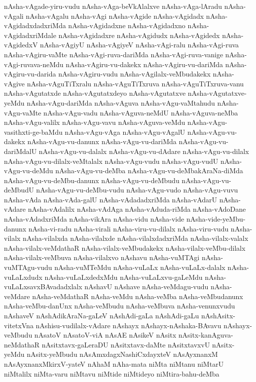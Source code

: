 {nAsha-vAgade-yiru-vudu
nAsha-vAga-beVkAlalxve
nAsha-vAga-lAradu
nAsha-vAgali
nAsha-vAgalu
nAsha-vAgi
nAsha-vAgide
nAsha-vAgidadx
nAsha-vAgidadxdadxriMda
nAsha-vAgidadxne
nAsha-vAgidadxno
nAsha-vAgidadxriMdale
nAsha-vAgidadxre
nAsha-vAgidudx
nAsha-vAgidedx
nAsha-vAgidedxV
nAsha-vAgiyU
nAsha-vAgiyeV
nAsha-vAgi-ralu
nAsha-vAgi-ruva
nAsha-vAgiru-vaMte
nAsha-vAgi-ruva-dariMda
nAsha-vAgi-ruva-vanige
nAsha-vAgi-ruvava-neMdu
nAsha-vAgiru-vu-dakekx
nAsha-vAgiru-vu-dariMda
nAsha-vAgiru-vu-darida
nAsha-vAgiru-vudu
nAsha-vAgilalx-veMbudakekx
nAsha-vAgive
nAsha-vAguTiTxralu
nAsha-vAguTiTxruva
nAsha-vAguTiTxruva-vanu
nAsha-vAgutatxde
nAsha-vAgutatxdeyo
nAsha-vAgutatxve
nAsha-vAgutatxve-yeMdu
nAsha-vAgu-dariMda
nAsha-vAguva
nAsha-vAgu-vaMtahudu
nAsha-vAgu-vaMte
nAsha-vAgu-vadu
nAsha-vAguva-neMdU
nAsha-vAguva-neMba
nAsha-vAgu-valilx
nAsha-vAgu-vavu
nAsha-vAguva-veMdu
nAsha-vAgu-vasithxti-ge-baMdu
nAsha-vAgu-vAga
nAsha-vAgu-vAgalU
nAsha-vAgu-vu-dakekx
nAsha-vAgu-vu-danunx
nAsha-vAgu-vu-dariMda
nAsha-vAgu-vu-dariMdalU
nAsha-vAgu-vu-dalalx
nAsha-vAgu-vu-dAdare
nAsha-vAgu-vu-dilalx
nAsha-vAgu-vu-dilalx-veMtalalx
nAsha-vAgu-vudu
nAsha-vAgu-vudU
nAsha-vAgu-vu-deMdu
nAsha-vAgu-vu-deMba
nAsha-vAgu-vu-deMbakAraNa-diMda
nAsha-vAgu-vu-deMbu-danunx
nAsha-vAgu-vu-deMbudu
nAsha-vAgu-vu-deMbudU
nAsha-vAgu-vu-deMbu-vudu
nAsha-vAgu-vudo
nAsha-vAgu-vuvu
nAsha-vAda
nAsha-vAda-galU
nAsha-vAdadadxriMda
nAsha-vAdarU
nAsha-vAdare
nAsha-vAdalilx
nAsha-vAdAga
nAsha-vAduda-riMda
nAsha-vAdoDane
nAsha-vAdadxriMda
nAsha-vikAra
nAsha-vidu
nAsha-vide
nAsha-vide-yeMbu-danunx
nAsha-vi-radu
nAsha-virali
nAsha-viru-vu-dilalx
nAsha-viru-vudu
nAsha-vilalx
nAsha-vilalxda
nAsha-vilalxde
nAsha-vilalxdadxriMda
nAsha-vilalx-valalx
nAsha-vilalx-veMdathaR
nAsha-vilalx-veMbudakekx
nAsha-vilalx-veMbu-dilalx
nAsha-vilalx-veMbuva
nAsha-vilalxvo
nAshavu
nAsha-vuMTAgi
nAsha-vuMTAgu-vudu
nAsha-vuMTeMdu
nAsha-vuLaLx
nAsha-vuLaLx-dalalx
nAsha-vuLaLxdudx
nAsha-vuLaLxdedxMdu
nAsha-vuLaLxvu-gaLeMdu
nAsha-vuLaLxsavxBAvadadxlalx
nAshavU
nAshave
nAsha-veMdagu-vudu
nAsha-veMdare
nAsha-veMdathaR
nAsha-veMdu
nAsha-veMba
nAsha-veMbudanunx
nAsha-veMbu-danUnx
nAsha-veMbudu
nAsha-veMbuva
nAsha-venunxvudu
nAshaveV
nAshAdikAraNa-gaLeV
nAshAdi-gaLa
nAshAdi-gaLu
nAshAsitx-vitetxVna
nAshisu-vudilalx-vAdare
nAshayx
nAshayx-nAshaka-BAvavu
nAshayx-veMbudu
nAsatoV
nAsatoV-viA
nAsAE
nAsikeV
nAsitx
nAsitx-kanAguva-neMdathaR
nAsitxtavx-gaLeraDU
nAsitxtavx-daMte
nAsitxtavxvU
nAsitx-yeMdu
nAsitx-yeMbudu
nAsAmxdagxNashiCxdayxteV
nAsAyxnanxM
nAsAyxnanxMkirxV-yateV
nAhaM
nAha-mata
niMta
niMtanu
niMtarU
niMtalilx
niMta-varu
niMtavu
niMtide
niMtideyo
niMtira-bahu-deMba
}
